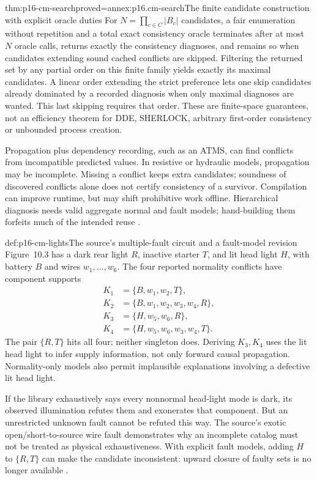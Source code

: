 \begin{hbtheorem}{thm:p16-cm-search}{proved=annex:p16.cm-search}{The finite candidate construction with explicit oracle duties}
For \(N=\prod_{c\in C}|B_c|\) candidates, a fair enumeration without
repetition and a total exact consistency oracle terminates after at most
\(N\) oracle calls, returns exactly the consistency diagnoses, and remains
so when candidates extending sound cached conflicts are skipped.
Filtering the returned set by any partial order on this finite family yields exactly
its maximal candidates. A linear order extending the strict preference lets
one skip candidates already dominated by a recorded diagnosis when only
maximal diagnoses are wanted. This last skipping requires that order.
These are finite-space guarantees, not an efficiency theorem for DDE,
SHERLOCK, arbitrary first-order consistency or unbounded process creation.
\end{hbtheorem}

Propagation plus dependency recording, such as an ATMS, can find conflicts
from incompatible predicted values. In resistive or hydraulic models,
propagation may be incomplete. Missing a conflict keeps extra candidates;
soundness of discovered conflicts alone does not certify consistency of a
survivor. Compilation can improve runtime, but may shift prohibitive work
offline. Hierarchical diagnosis needs valid aggregate normal and fault models;
hand-building them forfeits much of the intended reuse
\cite[pp.~420--422]{Struss2008ModelBasedProblemSolving}.

\begin{hbexample}{def:p16-cm-lights}{The source's multiple-fault circuit and a fault-model revision}
Figure~10.3 has a dark rear light \(R\), inactive starter \(T\), and
lit head light \(H\), with battery \(B\) and wires \(w_1,\ldots,w_6\).
The four reported normality conflicts have component supports
\[
\begin{split}
K_1&=\{B,w_1,w_2,T\},\\
K_2&=\{B,w_1,w_2,w_3,w_4,R\},\\
K_3&=\{H,w_5,w_6,R\},\\
K_4&=\{H,w_5,w_6,w_3,w_4,T\}.
\end{split}
\]
The pair \(\{R,T\}\) hits all four; neither singleton does.
Deriving \(K_3,K_4\) uses the lit head light to infer supply information,
not only forward causal propagation. Normality-only models also permit
implausible explanations involving a defective lit head light.

If the library exhaustively says every nonnormal head-light mode is dark,
its observed illumination refutes them and exonerates that component.
But an unrestricted unknown fault cannot be refuted this way. The source's
exotic open/short-to-source wire fault demonstrates why an incomplete catalog
must not be treated as physical exhaustiveness. With explicit fault models,
adding \(H\) to \(\{R,T\}\) can make the candidate inconsistent:
upward closure of faulty sets is no longer available
\cite[pp.~412--415]{Struss2008ModelBasedProblemSolving}.
\end{hbexample}

